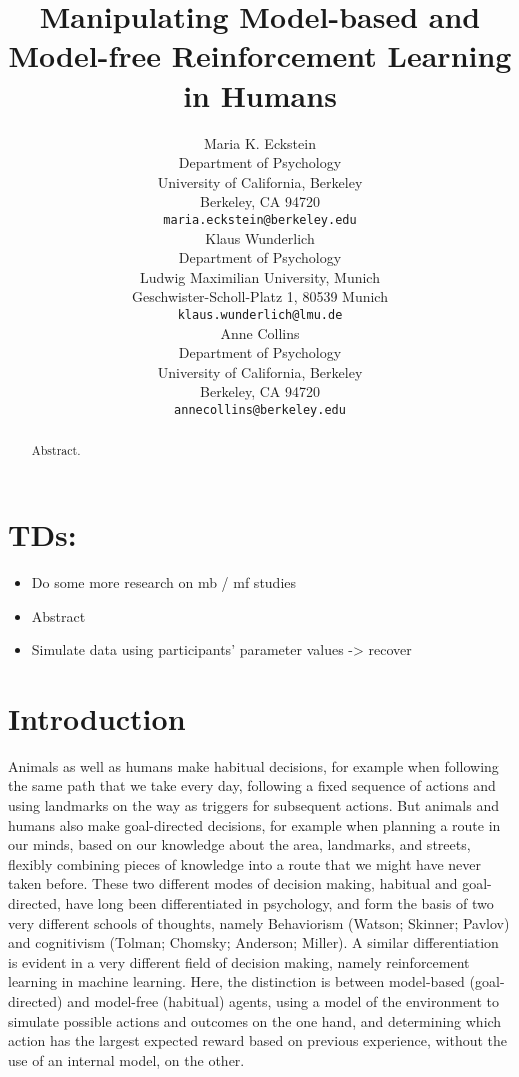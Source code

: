 \documentclass[11pt]{article} %
\title{Manipulating Model-based and Model-free Reinforcement Learning in Humans}
\author{
Maria K. Eckstein \\
Department of Psychology \\
University of California, Berkeley \\
Berkeley, CA 94720 \\
\texttt{maria.eckstein@berkeley.edu} \\
\And
Klaus Wunderlich \\
Department of Psychology \\
Ludwig Maximilian University, Munich \\
Geschwister-Scholl-Platz 1, 80539 Munich \\
\texttt{klaus.wunderlich@lmu.de} \\
\And
Anne Collins \\
Department of Psychology\\
University of California, Berkeley \\
Berkeley, CA 94720  \\
\texttt{annecollins@berkeley.edu} \\
}
\begin{document}
\maketitle

\begin{abstract}
Abstract. 
\end{abstract}




\section*{TDs:}
\begin{itemize}
	\item Do some more research on mb / mf studies
	\item Abstract
	\item Simulate data using participants' parameter values -> recover
\end{itemize}

\startmain

\section{Introduction}

Animals as well as humans make habitual decisions, for example when following the same path that we take every day, following a fixed sequence of actions and using landmarks on the way as triggers for subsequent actions. But animals and humans also make goal-directed decisions, for example when planning a route in our minds, based on our knowledge about the area, landmarks, and streets, flexibly combining pieces of knowledge into a route that we might have never taken before. These two different modes of decision making, habitual and goal-directed, have long been differentiated in psychology, and form the basis of two very different schools of thoughts, namely Behaviorism (Watson; Skinner; Pavlov) and cognitivism (Tolman; Chomsky; Anderson; Miller). A similar differentiation is evident in a very different field of decision making, namely reinforcement learning in machine learning. Here, the distinction is between model-based (goal-directed) and model-free (habitual) agents, using a model of the environment to simulate possible actions and outcomes on the one hand, and determining which action has the largest expected reward based on previous experience, without the use of an internal model, on the other. 
\end{document}

